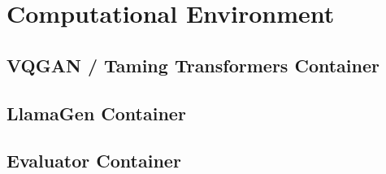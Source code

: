 \chapter{Computational Environment}
\label{ch:computational_environment}

\section{VQGAN / Taming Transformers Container}
\label{sec:vqgan_container}

\section{LlamaGen Container}
\label{sec:llamagen_container}

\section{Evaluator Container}
\label{sec:evaluator_container}
